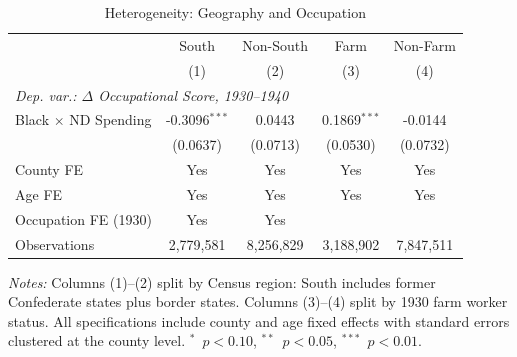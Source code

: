 \begin{table}[t]
\centering
\caption{Heterogeneity: Geography and Occupation}
\label{tab:hetero}
\begin{tabular}{lcccc}
\toprule
 & South & Non-South & Farm & Non-Farm \\
 & (1) & (2) & (3) & (4) \\
\midrule
\multicolumn{5}{l}{\textit{Dep. var.: $\Delta$ Occupational Score, 1930--1940}} \\[6pt]
Black $\times$ ND Spending & -0.3096$^{***}$ & 0.0443 & 0.1869$^{***}$ & -0.0144 \\
 & (0.0637) & (0.0713) & (0.0530) & (0.0732) \\[6pt]
County FE & Yes & Yes & Yes & Yes \\
Age FE & Yes & Yes & Yes & Yes \\
Occupation FE (1930) & Yes & Yes & & \\
Observations & 2,779,581 & 8,256,829 & 3,188,902 & 7,847,511 \\
\bottomrule
\end{tabular}
\begin{tablenotes}
\item \textit{Notes:} Columns (1)--(2) split by Census region: South includes former Confederate states plus border states. Columns (3)--(4) split by 1930 farm worker status. All specifications include county and age fixed effects with standard errors clustered at the county level. $^{*}$~$p<0.10$, $^{**}$~$p<0.05$, $^{***}$~$p<0.01$.
\end{tablenotes}
\end{table}
